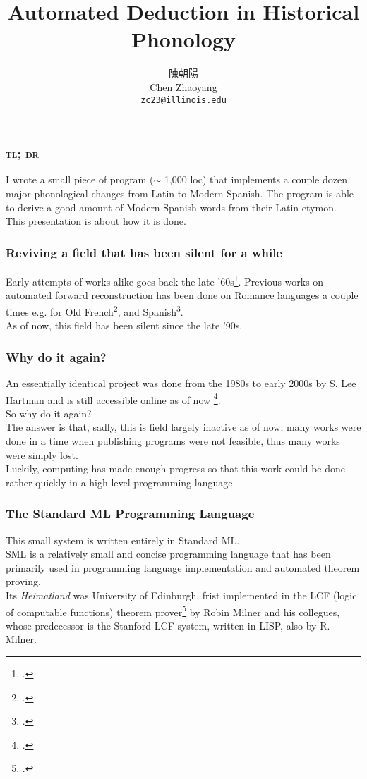 \documentclass{beamer}
\title{Automated Deduction in Historical Phonology}
\author{陳朝陽 \\ Chen Zhaoyang \\ \texttt{zc23@illinois.edu}}
\begin{document}
\maketitle

\begin{frame}
	\frametitle{\textsc{tl; dr}}

	I wrote a small piece of program ($\sim$ 1,000 loc) that implements a couple dozen major phonological changes from Latin to Modern Spanish. The program is able to derive a good amount of Modern Spanish words from their Latin etymon. \\
	This presentation is about how it is done.
\end{frame}

\begin{frame}
	\frametitle{Reviving a field that has been silent for a while}

    Early attempts of works alike goes back the late '60s\footcites{williams_mechanise_phone}{smith69:_autom_simul_histor_chang}. Previous works on automated forward reconstruction has been done on Romance languages a couple times e.g. for Old French\footcite{burton-hunter76:_roman_etymol}, and Spanish\footcite{eastlack77:_progr_simul_system_sound_chang_ibero_roman}. \\
    As of now, this field has been silent since the late '90s.
\end{frame}

\begin{frame}
    \frametitle{Why do it again?}
  
	An essentially identical project was done from the 1980s to early 2000s by S. Lee Hartman and is still accessible online as of now \footcite{hartman_phono}. \\
	So why do it again? \\
	The answer is that, sadly, this is field largely inactive as of now; many works were done in a time when publishing programs were not feasible, thus many works were simply lost. \\
	Luckily, computing has made enough progress so that this work could be done rather quickly in a high-level programming language.
\end{frame}

\begin{frame}
	\frametitle{The Standard ML Programming Language}

	This small system is written entirely in Standard ML. \\
	SML is a relatively small and concise programming language that has been primarily used in programming language implementation and automated theorem proving. \\
	Its \emph{Heimatland} was University of Edinburgh, frist implemented in the LCF (logic of computable functions) theorem prover\footcite{macqueen20:_histor_stand_ml} by Robin Milner and his collegues, whose predecessor is the Stanford LCF system, written in LISP, also by R. Milner. \\
\end{frame}
\end{document}
